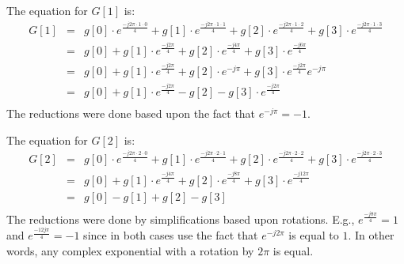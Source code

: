 The equation for $G[1]$ is:
\begin{equation}
\begin{array} {lll} 
G[1] & = & g[0] \cdot e^{\frac{-j 2 \pi \cdot 1 \cdot 0}{4}} + g[1] \cdot e^{\frac{-j 2 \pi \cdot 1 \cdot 1}{4}} + g[2] \cdot e^{\frac{-j 2 \pi \cdot 1 \cdot 2}{4}} + g[3] \cdot e^{\frac{-j 2 \pi \cdot 1 \cdot 3}{4}}\\
 & = & g[0] + g[1] \cdot e^{\frac{-j 2 \pi}{4}} + g[2] \cdot e^{\frac{-j 4 \pi}{4}} + g[3] \cdot e^{\frac{-j 6 \pi}{4}}\\
 & = & g[0] + g[1] \cdot e^{\frac{-j 2 \pi}{4}} + g[2] \cdot e^{-j \pi}   + g[3] \cdot e^{\frac{-j 2 \pi}{4}} e^{-j \pi} \\
 & = & g[0] + g[1] \cdot e^{\frac{-j 2 \pi}{4}} - g[2] - g[3] \cdot e^{\frac{-j 2 \pi}{4}}\\
\end{array} 
\end{equation} The reductions were done based upon the fact that $e^{-j \pi} = -1$. 

The equation for $G[2]$ is:
\begin{equation}
\begin{array} {lll} 
G[2] & = & g[0] \cdot e^{\frac{-j 2 \pi \cdot 2 \cdot 0}{4}} + g[1] \cdot e^{\frac{-j 2 \pi \cdot 2 \cdot 1}{4}} + g[2] \cdot e^{\frac{-j 2 \pi \cdot 2 \cdot 2}{4}} + g[3] \cdot e^{\frac{-j 2 \pi \cdot 2 \cdot 3}{4}}\\
 & = & g[0] + g[1] \cdot e^{\frac{-j 4 \pi}{4}} + g[2] \cdot e^{\frac{-j 8 \pi}{4}} + g[3] \cdot e^{\frac{-j 12 \pi}{4}}\\
 & = & g[0] - g[1]  + g[2] -  g[3] \\
\end{array} 
\end{equation} The reductions were done by simplifications based upon rotations. E.g., $e^{\frac{-j 8 \pi}{4}} = 1$ and $e^{\frac{-12 j \pi}{4}} = -1$ since in both cases use the fact that $e^{-j 2\pi}$ is equal to $1$. In other words, any complex exponential with a rotation by $2 \pi$ is equal.

